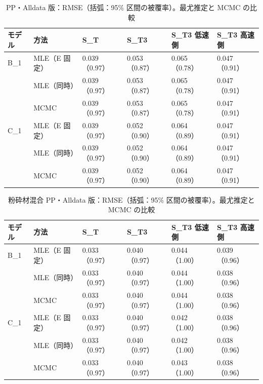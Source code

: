 \documentclass[paper=a4paper,fontsize=10.5pt,line_length=44zw,number_of_lines=38]{jlreq}
\begin{document}
\begin{table}[H]
\caption{PP・Alldata 版：RMSE（括弧：95\% 区間の被覆率）。最尤推定と MCMC の比較}\label{tab:met_Alldata_PP}
\small
\begin{tabularx}{\linewidth}{@{}llXXXX@{}}
\toprule
モデル & 方法 & S\_T & S\_T3 & S\_T3 低速側 & S\_T3 高速側 \\
\midrule
B\_1 & MLE（E 固定） & 0.039（0.97） & 0.053（0.87） & 0.065（0.78） & 0.047（0.91） \\
 & MLE（同時） & 0.039（0.97） & 0.053（0.87） & 0.065（0.78） & 0.047（0.91） \\
 & MCMC & 0.039（0.97） & 0.053（0.87） & 0.065（0.78） & 0.047（0.91） \\
\midrule
C\_1 & MLE（E 固定） & 0.039（0.97） & 0.052（0.90） & 0.064（0.89） & 0.047（0.91） \\
 & MLE（同時） & 0.039（0.97） & 0.052（0.90） & 0.064（0.89） & 0.047（0.91） \\
 & MCMC & 0.039（0.97） & 0.052（0.90） & 0.064（0.89） & 0.047（0.91） \\

\bottomrule
\end{tabularx}
\end{table}

\begin{table}[H]
\caption{粉砕材混合 PP・Alldata 版：RMSE（括弧：95\% 区間の被覆率）。最尤推定と MCMC の比較}\label{tab:met_Alldata_MIX}
\small
\begin{tabularx}{\linewidth}{@{}llXXXX@{}}
\toprule
モデル & 方法 & S\_T & S\_T3 & S\_T3 低速側 & S\_T3 高速側 \\
\midrule
B\_1 & MLE（E 固定） & 0.033（0.97） & 0.040（0.97） & 0.044（1.00） & 0.039（0.96） \\
 & MLE（同時） & 0.033（0.97） & 0.040（0.97） & 0.044（1.00） & 0.038（0.96） \\
 & MCMC & 0.033（0.97） & 0.040（0.97） & 0.044（1.00） & 0.038（0.96） \\
\midrule
C\_1 & MLE（E 固定） & 0.033（0.97） & 0.040（0.97） & 0.042（1.00） & 0.038（0.96） \\
 & MLE（同時） & 0.033（0.97） & 0.040（0.97） & 0.042（1.00） & 0.038（0.96） \\
 & MCMC & 0.033（0.97） & 0.040（0.97） & 0.043（1.00） & 0.038（0.96） \\

\bottomrule
\end{tabularx}
\end{table}
\end{document}
